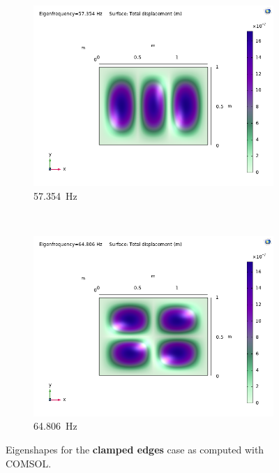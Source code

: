 \documentclass[a4paper]{article}
\begin{document}
\begin{figure}[h]
	\begin{subfigure}[b]{0.31\linewidth}
		\includegraphics[width=0.9\linewidth]{comsol/4c.png}
		\caption*{\SI{57.354}{\hertz}}
	\end{subfigure}
	~
	\begin{subfigure}[b]{0.31\linewidth}
		\includegraphics[width=0.9\linewidth]{comsol/5c.png}
		\caption*{\SI{64.806}{\hertz}}
	\end{subfigure}
	\caption{Eigenshapes for the \textbf{clamped edges} case as computed with COMSOL.}
	\label{fig:c_com}
\end{figure}
\end{document}
